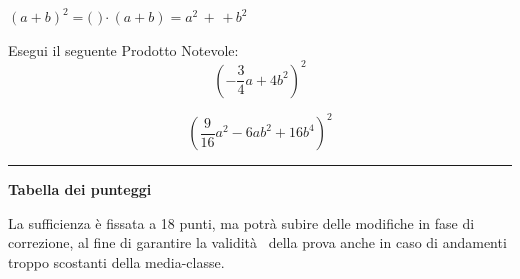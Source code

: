 \documentclass[11pt, a4paper, answers]{exam}
\begin{document}
\begin{questions}
\begin{parts}
\( (a + b )^2 = (\) \fillin[\(a + b \)][30pt] \() \cdot (a + b) = a^2 \, + \) \fillin[\( 2ab\)][20pt] \( + \, b^2 \)

\end{parts}
\vspace{.6cm}


\addpoints
{}

Esegui il seguente Prodotto Notevole: \[ \left(- \dfrac {3}{4}a + 4b^2 \right)^2 \]

\begin{solution}
\[ \left( \dfrac {9}{16}a^2 - 6ab^2 + 16b^4 \right)^2 \]
\end{solution}

\end{questions}

\noindent
\rule[2ex]{\textwidth}{1pt}

\begin{center}
{\bf Tabella dei punteggi}
\vspace{10pt}

\combinedgradetable[h][questions]
\end{center}
\vspace{4pt}
\footnotesize La sufficienza è fissata a 18 punti, ma potrà subire delle modifiche in fase di correzione, al fine di garantire la validità  della prova anche in caso di andamenti troppo scostanti della media-classe.
\end{document}
